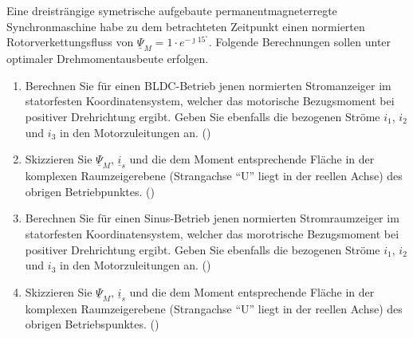 \begin{question}[topic=psm,type=exam,tags={20160618}]
Eine dreisträngige symetrische aufgebaute permanentmagneterregte Synchronmaschine habe zu dem betrachteten Zeitpunkt einen normierten Rotorverkettungsfluss von $\underline{\Psi}_M = 1 \cdot e^{-\jmath15^\circ}$. Folgende Berechnungen sollen unter optimaler Drehmomentausbeute erfolgen.
\begin{enumerate}
\item Berechnen Sie für einen BLDC-Betrieb jenen normierten Stromanzeiger im statorfesten Koordinatensystem, welcher das motorische Bezugsmoment bei positiver Drehrichtung ergibt. Geben Sie ebenfalls die bezogenen Ströme $i_1$, $i_2$ und $i_3$ in den Motorzuleitungen an. ()
\item Skizzieren Sie $\underline{\Psi}_M$, $\underline{i}_s$ und die dem Moment entsprechende Fläche in der komplexen Raumzeigerebene (Strangachse ``U'' liegt in der reellen Achse) des obrigen Betriebpunktes. ()
\item Berechnen Sie für einen Sinus-Betrieb jenen normierten Stromraumzeiger im statorfesten Koordinatensystem, welcher das morotrische Bezugsmoment bei positiver Drehrichtung ergibt. Geben Sie ebenfalls die bezogenen Ströme $i_1$, $i_2$ und $i_3$ in den Motorzuleitungen an. ()
\item Skizzieren Sie $\underline{\Psi}_M$, $\underline{i}_s$ und die dem Moment entsprechende Fläche in der komplexen Raumzeigerebene (Strangachse ``U'' liegt in der reellen Achse) des obrigen Betriebspunktes. ()
\end{enumerate}
\end{question}
